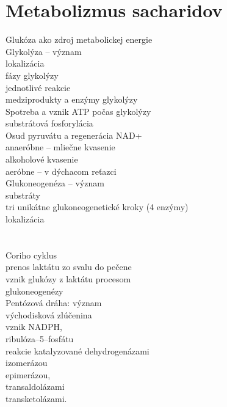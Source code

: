 \section{Metabolizmus sacharidov}
Glukóza ako zdroj metabolickej energie\\
Glykolýza -- význam\\
\tab lokalizácia\\
 fázy glykolýzy\\
\tab jednotlivé reakcie\\
\tab medziprodukty a enzýmy glykolýzy\\
Spotreba a vznik ATP počas glykolýzy\\
\tab substrátová fosforylácia\\
Osud pyruvátu a regenerácia NAD+\\
\tab anaeróbne -- mliečne kvasenie\\
\tab alkoholové kvasenie\\
\tab aeróbne -- v dýchacom reťazci\\
Glukoneogenéza -- význam\\
\tab substráty\\
\tab tri unikátne glukoneogenetické kroky (4 enzýmy)\\
\tab lokalizácia\\
\\
\\
Coriho cyklus\\
\tab prenos laktátu zo svalu do pečene\\
\tab vznik glukózy z laktátu procesom\\
glukoneogenézy\\
Pentózová dráha: význam\\
\tab východisková zlúčenina\\
\tab vznik NADPH,\\
ribulóza--5--fosfátu\\
\tab reakcie katalyzované dehydrogenázami\\
\tab izomerázou\\
\tab epimerázou,\\
transaldolázami\\
\tab transketolázami.\\
\\
